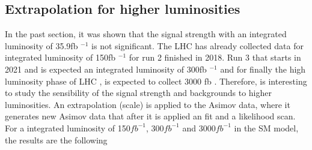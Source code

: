 \begin{linenumbers}
\section{Extrapolation for higher luminosities}
In the past section, it was shown that the signal strength  with an integrated luminosity of 35.9fb $^{-1}$ is not significant. The LHC has already collected data for integrated luminosity of 150fb $^{-1}$ for run 2 finished in 2018. Run 3 that starts in 2021 and is expected an integrated luminosity of 300fb $^{-1}$ and for finally the high luminosity phase of LHC , is expected to collect 3000 fb . Therefore, is interesting to study the sensibility of the signal strength and backgrounds to higher luminosities. 
An extrapolation (scale) is applied to the Asimov data, where it generates new Asimov data that after it is applied an fit and a likelihood scan.
For a integrated luminosity of 150$fb^{-1}$, 300$fb^{-1}$ and 3000$fb^{-1}$ in the SM model, the results are the following
\pagebreak


\end{linenumbers}
